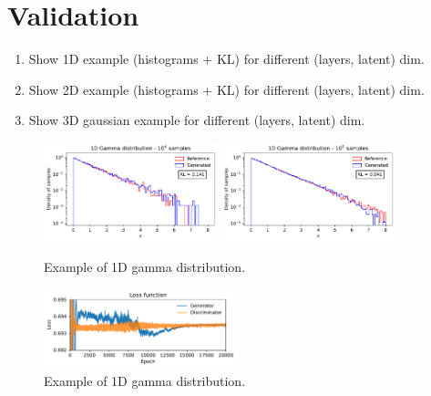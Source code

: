 \documentclass[twocolumn,preprintnumbers,superscriptaddress]{revtex4-2}
\begin{document}
\section{Validation}
\label{sec:validation}

\begin{enumerate}
  \item Show 1D example (histograms + KL) for different (layers, latent) dim.
  \item Show 2D example (histograms + KL) for different (layers, latent) dim.
  \item Show 3D gaussian example for different (layers, latent) dim.
\end{enumerate}

\begin{figure}
  \includegraphics[width=0.45\textwidth]{plots/1Dgamma/1Dgamma_distribution_10k.pdf}
  \includegraphics[width=0.45\textwidth]{plots/1Dgamma/1Dgamma_distribution_100k.pdf}
  \caption{Example of 1D gamma distribution.}
\end{figure}


\begin{figure}
  \includegraphics[width=0.5\textwidth]{plots/1Dgamma/1Dgamma_loss.pdf}
  \caption{Example of 1D gamma distribution.}
\end{figure}
\end{document}

